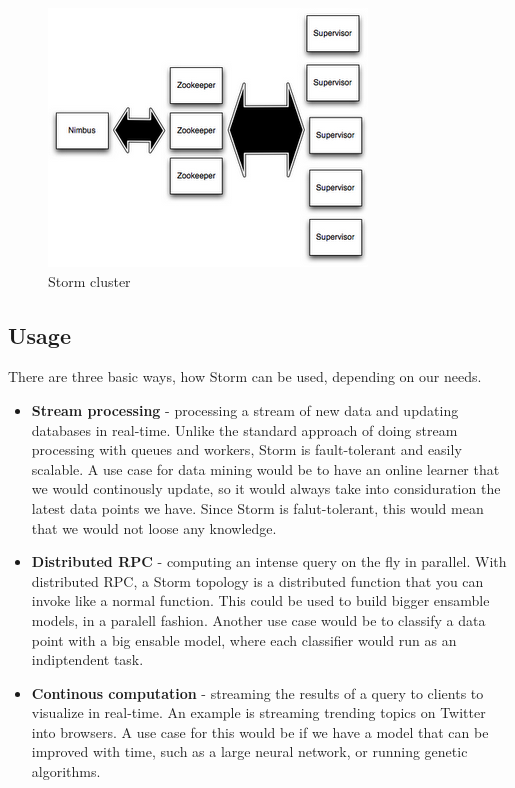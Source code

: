 \documentclass[journal]{IEEEtran/IEEEtran}
\begin{document}
\begin{figure}[htbp]
    \begin{center}
        \includegraphics[scale=0.70]{img/storm-cluster.png}
        \caption{Storm cluster}
        \label{stormcluster}
    \end{center}
\end{figure}


\subsection{Usage}

There are three basic ways, how Storm can be used, depending on our needs. \\

\begin{itemize}
    \item \textbf{Stream processing} - processing a stream of new data and updating databases in real-time. Unlike the standard approach of doing stream processing with queues and workers, Storm is fault-tolerant and easily scalable. A use case for data mining would be to have an online learner that we would continously update, so it would always take into considuration the latest data points we have. Since Storm is falut-tolerant, this would mean that we would not loose any knowledge.
    \item \textbf{Distributed RPC} - computing an intense query on the fly in parallel. With distributed RPC, a Storm topology is a distributed function that you can invoke like a normal function. This could be used to build bigger ensamble models, in a paralell fashion. Another use case would be to classify a data point with a big ensable model, where each classifier would run as an indiptendent task.
    \item \textbf{Continous computation} - streaming the results of a query to clients to visualize in real-time. An example is streaming trending topics on Twitter into browsers. A use case for this would be if we have a model that can be improved with time, such as a large neural network, or running genetic algorithms.
\end{itemize}
\end{document}
